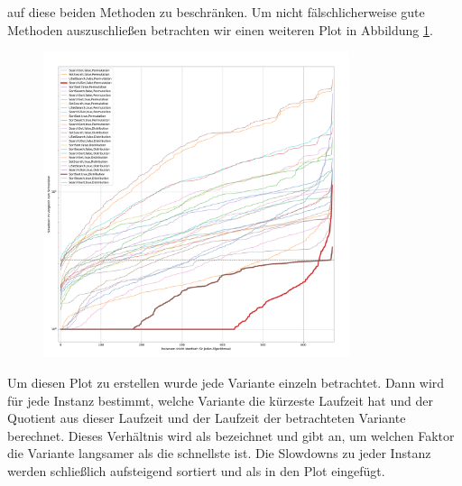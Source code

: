 auf diese beiden Methoden zu beschränken. Um nicht fälschlicherweise \glqq gute\grqq{} Methoden auszuschließen
betrachten wir einen weiteren Plot in Abbildung \ref{fig:messung_slowdown}. 
\begin{figure}[h]
\centering
	\includegraphics[width = 0.8\textwidth]{figures/slowdown.pdf}
	\caption{}
	\label{fig:messung_slowdown}
\end{figure}
Um diesen Plot zu erstellen wurde jede Variante einzeln betrachtet.
Dann wird für jede Instanz bestimmt, welche Variante die kürzeste Laufzeit hat und der Quotient
aus dieser Laufzeit und der Laufzeit der betrachteten Variante berechnet. Dieses Verhältnis wird als 
bezeichnet und gibt an, um welchen Faktor die Variante langsamer als die schnellste ist. Die Slowdowns
zu jeder Instanz werden schließlich aufsteigend sortiert und als  in den Plot eingefügt.






